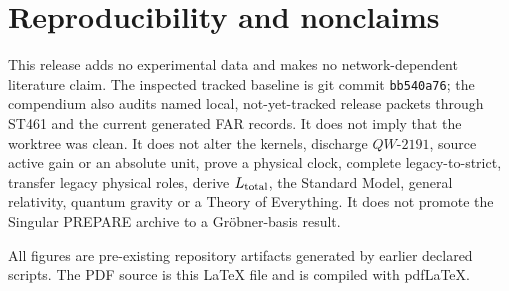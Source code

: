 \documentclass[11pt,a4paper]{article}
\theoremstyle{definition}
\theoremstyle{remark}
\begin{document}
\section{Reproducibility and nonclaims}

This release adds no experimental data and makes no network-dependent literature claim. The inspected tracked baseline is git commit \texttt{bb540a76}; the compendium also audits named local, not-yet-tracked release packets through ST461 and the current generated FAR records. It does not imply that the worktree was clean. It does not alter the kernels, discharge $QW\text{-}2191$, source active gain or an absolute unit, prove a physical clock, complete legacy-to-strict, transfer legacy physical roles, derive $L_{\rm total}$, the Standard Model, general relativity, quantum gravity or a Theory of Everything. It does not promote the Singular PREPARE archive to a Gröbner-basis result.

All figures are pre-existing repository artifacts generated by earlier declared scripts. The PDF source is this \LaTeX{} file and is compiled with pdf\LaTeX{}.
\end{document}
